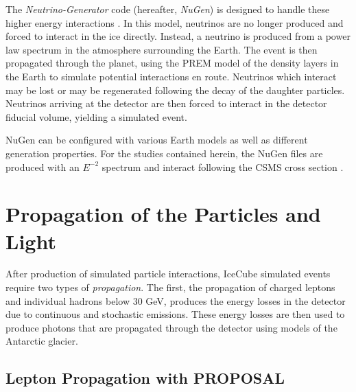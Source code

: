 The \emph{Neutrino-Generator} code (hereafter, \emph{NuGen}) is designed to handle these higher energy interactions \cite{NuGen}.
In this model, neutrinos are no longer produced and forced to interact in the ice directly.
Instead, a neutrino is produced from a power law spectrum in the atmosphere surrounding the Earth.
The event is then propagated through the planet, using the PREM model of the density layers in the Earth \cite{PREM} to simulate potential interactions en route. 
Neutrinos which interact may be lost or may be regenerated following the decay of the daughter particles.
Neutrinos arriving at the detector are then forced to interact in the detector fiducial volume, yielding a simulated event.

NuGen can be configured with various Earth models as well as different generation properties. 
For the studies contained herein, the NuGen files are produced with an $E^{-2}$ spectrum and interact following the CSMS cross section \cite{CSMS}.












\section{Propagation of the Particles and Light}
\label{sec:propagation}
After production of simulated particle interactions, IceCube simulated events require two types of \emph{propagation}.
The first, the propagation of charged leptons and individual hadrons below 30 GeV, produces the energy losses in the detector due to continuous and stochastic emissions.
These energy losses are then used to produce photons that are propagated through the detector using models of the Antarctic glacier.


\subsection{Lepton Propagation with PROPOSAL}
\label{subsec:proposal}

